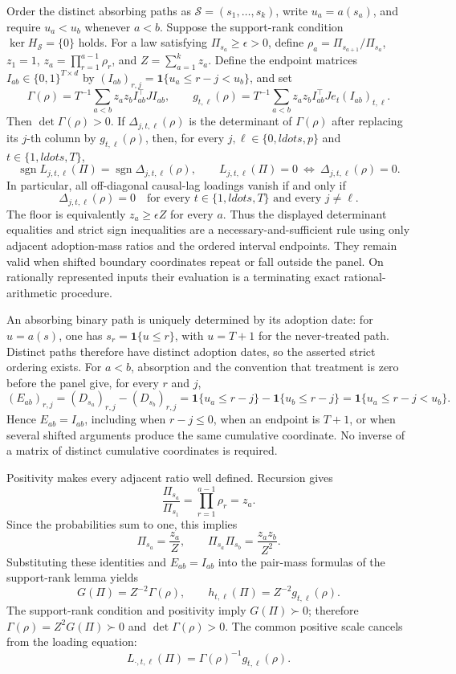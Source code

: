 Order the distinct absorbing paths as \(\mathcal S=(s_1,\ldots,s_k)\), write \(u_a=a(s_a)\), and require \(u_a<u_b\) whenever \(a<b\).  Suppose the support-rank condition \(\ker H_{\mathcal S}=\{0\}\) holds.  For a law satisfying \(\Pi_{s_a}\geq\epsilon>0\), define \(\rho_a=\Pi_{s_{a+1}}/\Pi_{s_a}\), \(z_1=1\), \(z_a=\prod_{r=1}^{a-1}\rho_r\), and \(Z=\sum_{a=1}^kz_a\).  Define the endpoint matrices \(I_{ab}\in\{0,1\}^{T\times d}\) by \((I_{ab})_{r,j}=\mathbf 1\{u_a\leq r-j<u_b\}\), and set
\[
 \Gamma(\rho)=T^{-1}\sum_{a<b}z_az_bI_{ab}^{\top}JI_{ab},\qquad
 g_{t,\ell}(\rho)=T^{-1}\sum_{a<b}z_az_bI_{ab}^{\top}Je_t(I_{ab})_{t,\ell}.
\]
Then \(\det\Gamma(\rho)>0\).  If \(\Delta_{j,t,\ell}(\rho)\) is the determinant of \(\Gamma(\rho)\) after replacing its \(j\)-th column by \(g_{t,\ell}(\rho)\), then, for every \(j,\ell\in\{0,ldots,p\}\) and \(t\in\{1,ldots,T\}\),
\[
 \operatorname{sgn}L_{j,t,\ell}(\Pi)=\operatorname{sgn}\Delta_{j,t,\ell}(\rho),
 \qquad
 L_{j,t,\ell}(\Pi)=0\ \Longleftrightarrow\ \Delta_{j,t,\ell}(\rho)=0.
\]
In particular, all off-diagonal causal-lag loadings vanish if and only if
\[
 \Delta_{j,t,\ell}(\rho)=0
 \quad\text{for every }t\in\{1,ldots,T\}\text{ and every }j\ne\ell.
\]
The floor is equivalently \(z_a\geq\epsilon Z\) for every \(a\).  Thus the displayed determinant equalities and strict sign inequalities are a necessary-and-sufficient rule using only adjacent adoption-mass ratios and the ordered interval endpoints.  They remain valid when shifted boundary coordinates repeat or fall outside the panel.  On rationally represented inputs their evaluation is a terminating exact rational-arithmetic procedure.

An absorbing binary path is uniquely determined by its adoption date: for \(u=a(s)\), one has \(s_r=\mathbf 1\{u\leq r\}\), with \(u=T+1\) for the never-treated path.  Distinct paths therefore have distinct adoption dates, so the asserted strict ordering exists.  For \(a<b\), absorption and the convention that treatment is zero before the panel give, for every \(r\) and \(j\),
\[
 (E_{ab})_{r,j}
 =(D_{s_a})_{r,j}-(D_{s_b})_{r,j}
 =\mathbf 1\{u_a\leq r-j\}-\mathbf 1\{u_b\leq r-j\}
 =\mathbf 1\{u_a\leq r-j<u_b\}.
\]
Hence \(E_{ab}=I_{ab}\), including when \(r-j\leq0\), when an endpoint is \(T+1\), or when several shifted arguments produce the same cumulative coordinate.  No inverse of a matrix of distinct cumulative coordinates is required.

Positivity makes every adjacent ratio well defined.  Recursion gives
\[
 \frac{\Pi_{s_a}}{\Pi_{s_1}}=\prod_{r=1}^{a-1}\rho_r=z_a.
\]
Since the probabilities sum to one, this implies
\[
 \Pi_{s_a}=\frac{z_a}{Z},
 \qquad
 \Pi_{s_a}\Pi_{s_b}=\frac{z_az_b}{Z^2}.
\]
Substituting these identities and \(E_{ab}=I_{ab}\) into the pair-mass formulas of the support-rank lemma yields
\[
 G(\Pi)=Z^{-2}\Gamma(\rho),
 \qquad
 h_{t,\ell}(\Pi)=Z^{-2}g_{t,\ell}(\rho).
\]
The support-rank condition and positivity imply \(G(\Pi)\succ0\); therefore \(\Gamma(\rho)=Z^2G(\Pi)\succ0\) and \(\det\Gamma(\rho)>0\).  The common positive scale cancels from the loading equation:
\[
 L_{\cdot,t,\ell}(\Pi)=\Gamma(\rho)^{-1}g_{t,\ell}(\rho).
\]

